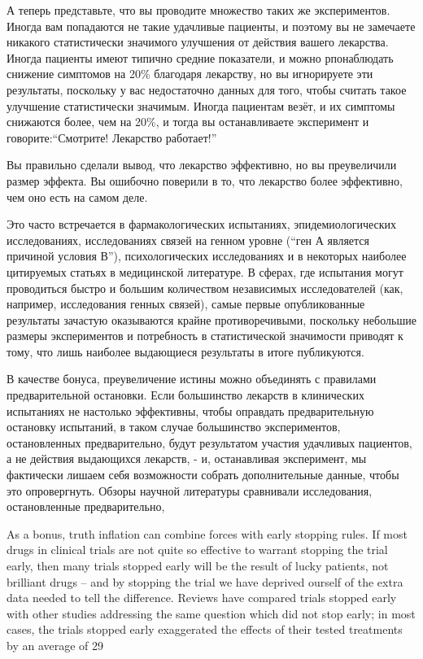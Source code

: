 А теперь представьте, что вы проводите множество таких же экспериментов. Иногда вам попадаются не такие удачливые пациенты, и поэтому вы не замечаете никакого статистически значимого улучшения от действия вашего лекарства. Иногда пациенты имеют типично средние показатели, и можно рпонаблюдать снижение симптомов на 20\% благодаря лекарству, но вы игнорируете эти результаты, поскольку у вас недостаточно данных для того, чтобы считать такое улучшение статистически значимым. Иногда пациентам везёт, и их симптомы снижаются более, чем на 20\%, и тогда вы останавливаете эксперимент и говорите:``Смотрите! Лекарство работает!'' 

Вы правильно сделали вывод, что лекарство эффективно, но вы преувеличили размер эффекта. Вы ошибочно поверили в то, что лекарство более эффективно, чем оно есть на самом деле. 

Это часто встречается в фармакологических испытаниях, эпидемиологических исследованиях, исследованиях связей на генном уровне (``ген А является причиной условия В''), психологических исследованиях и в некоторых наиболее цитируемых статьях в медицинской литературе. \cite{ioannidis_why_2008,ioannidis_contradicted_2005} В сферах, где испытания могут проводиться быстро и большим количеством независимых исследователей (как, например, исследования генных связей), самые первые опубликованные результаты зачастую оказываются крайне противоречивыми, поскольку небольшие размеры экспериментов и потребность в статистической значимости приводят к тому, что лишь наиболее выдающиеся результаты в итоге публикуются. \cite{ioannidis_early_2005} 

В качестве бонуса, преувеличение истины можно объединять с правилами предварительной остановки. Если большинство лекарств в клинических испытаниях не настолько эффективны, чтобы оправдать предварительную остановку испытаний, в таком случае большинство экспериментов, остановленных предварительно, будут результатом участия удачливых пациентов, а не действия выдающихся лекарств, - и, останавливая эксперимент, мы фактически лишаем себя возможности собрать дополнительные данные, чтобы это опровергнуть. Обзоры научной литературы сравнивали исследования, остановленные предварительно,  

As a bonus, truth inflation can combine forces with early stopping rules. If most drugs in clinical trials are not quite so effective to warrant stopping the trial early, then many trials stopped early will be the result of lucky patients, not brilliant drugs – and by stopping the trial we have deprived ourself of the extra data needed to tell the difference. Reviews have compared trials stopped early with other studies addressing the same question which did not stop early; in most cases, the trials stopped early exaggerated the effects of their tested treatments by an average of 29%

